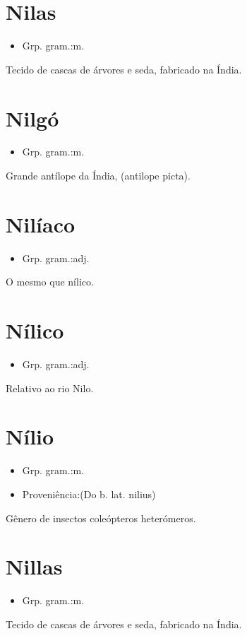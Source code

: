 \section{Nilas}
\begin{itemize}
\item {Grp. gram.:m.}
\end{itemize}
Tecido de cascas de árvores e seda, fabricado na Índia.
\section{Nilgó}
\begin{itemize}
\item {Grp. gram.:m.}
\end{itemize}
Grande antílope da Índia, (\textunderscore antilope picta\textunderscore ).
\section{Nilíaco}
\begin{itemize}
\item {Grp. gram.:adj.}
\end{itemize}
O mesmo que \textunderscore nílico\textunderscore .
\section{Nílico}
\begin{itemize}
\item {Grp. gram.:adj.}
\end{itemize}
Relativo ao rio Nilo.
\section{Nílio}
\begin{itemize}
\item {Grp. gram.:m.}
\end{itemize}
\begin{itemize}
\item {Proveniência:(Do b. lat. \textunderscore nilius\textunderscore )}
\end{itemize}
Gênero de insectos coleópteros heterómeros.
\section{Nillas}
\begin{itemize}
\item {Grp. gram.:m.}
\end{itemize}
Tecido de cascas de árvores e seda, fabricado na Índia.
